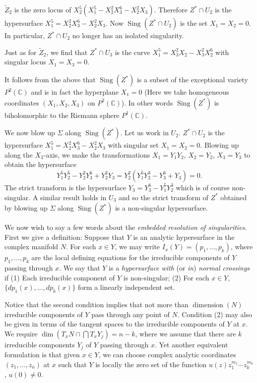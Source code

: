 $\widetilde Z_2$ is the zero locus of $X_2^5(X_1^5-X_2^2X_3^6-X_2^2X_3)$. Therefore $Z^*\cap U_2$ is the hypersurface $X_1^5=X_2^2X_3^6-X_2^2X_3$. Now $\operatorname{Sing}(Z^*\cap U_2)$ is the set $X_1=X_2=0$. In particular, $Z^*\cap U_2$ no longer has an isolated singularity.

Just as for $\widetilde Z_2$, we find that $Z^*\cap U_3$ is the curve $X_1^5=X_3^2X_2-X_3^2X_2^6$ with singular locus $X_1=X_3=0$.

It follows from the above that $\operatorname{Sing}(Z^*)$ is a subset of the exceptional variety $P^2(\mathbb C)$ and is in fact the hyperplane $X_1=0$ (Here we take homogeneous coordinates $(X_1,X_2,X_3)$ on $P^2(\mathbb C)$). In other words $\operatorname{Sing}(Z^*)$ is biholomorphic to the Riemann sphere $P^1(\mathbb C)$.

We now blow up $\Sigma$ along $\operatorname{Sing}(Z^*)$. Let us work in $U_2$. $Z^*\cap U_2$ is the hypersurface $X_1^5=X_2^2X_3^6-X_2^2X_3$ with singular set $X_1=X_2=0$. Blowing up along the $X_3$-axis, we make the transformations $X_1=Y_1Y_2$, $X_2=Y_2$, $X_3=Y_3$ to obtain the hypersurface
\[
Y_1^5Y_2^5-Y_2^2Y_3^6+Y_2^2Y_3=Y_2^2(Y_1^5Y_2^3-Y_3^6+Y_3)=0.
\]
The strict transform is the hypersurface $Y_3=Y_3^6-Y_1^5Y_2^3$ which is of course non-singular. A similar result holds in $U_3$ and so the strict transform of $Z^*$ obtained by blowing up $\Sigma$ along $\operatorname{Sing}(Z^*)$ is a non-singular hypersurface.

We now wish to say a few words about the \emph{embedded resolution of singularities}. First we give a definition: Suppose that $Y$ is an analytic hypersurface in the complex manifold $N$. For each $x\in Y$, we may write $I_x(Y)=(p_1,\ldots,p_k)$, where $p_1,\ldots,p_k$ are the local defining equations for the irreducible components of $Y$ passing through $x$. We say that $Y$ is a \emph{hypersurface with} (or \emph{in}) \emph{normal crossings} if (1) Each irreducible component of $Y$ is non-singular; (2) For each $x\in Y$, $\{dp_1(x),\ldots,dp_k(x)\}$ form a linearly independent set.

Notice that the second condition implies that not more than $\operatorname{dimension}(N)$ irreducible components of $Y$ pass through any point of $N$. Condition (2) may also be given in terms of the tangent spaces to the irreducible components of $Y$ at $x$. We require $\dim(T_xN\cap\bigcap T_xY_j)=n-k$, where we assume that there are $k$ irreducible components $Y_j$ of $Y$ passing through $x$. Yet another equivalent formulation is that given $x\in Y$, we can choose complex analytic coordinates $(z_1,\ldots,z_n)$ at $x$ such that $Y$ is locally the zero set of the function $u(z)z_1^{m_1}\cdots z_k^{m_k}$, $u(0)\neq0$.

